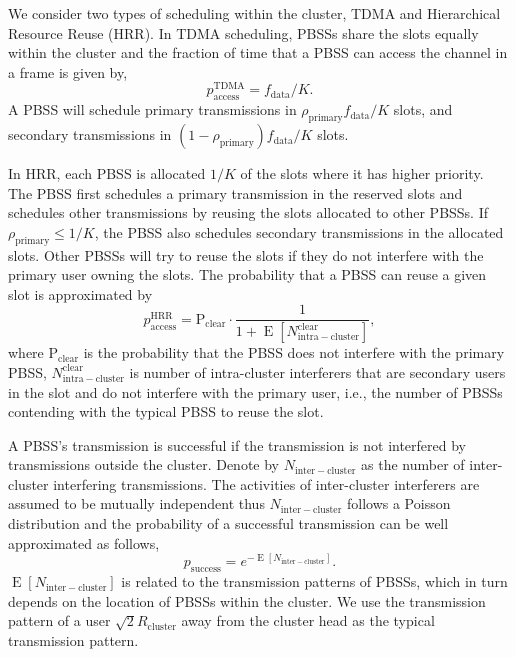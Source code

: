 \documentclass[10pt, conference, letterpaper]{IEEEtran}
\DeclareMathOperator*{\E}{\mathrm{E}}
\begin{document}
We consider two types of scheduling within the cluster, TDMA and Hierarchical Resource Reuse (HRR). In TDMA scheduling, PBSSs share the slots equally within the cluster and the fraction of time that a PBSS can access the channel in a frame is given by, 
\begin{equation*}
p_{\mathrm{access}}^{\mathrm{TDMA}} = f_{\mathrm{data}}/K.
\end{equation*}
A PBSS will schedule primary transmissions in $\rho_{\mathrm{primary}}f_{\mathrm{data}}/K$ slots, and secondary transmissions in $(1-\rho_{\mathrm{primary}})f_{\mathrm{data}}/K$ slots. 

In HRR, each PBSS is allocated $1/K$ of the slots where it has higher priority. 
The PBSS first schedules a primary transmission in the reserved slots and schedules other transmissions by reusing the slots allocated to other PBSSs. 
If $\rho_{\mathrm{primary}}\leq 1/K$, the PBSS also schedules secondary transmissions in the allocated slots. 
Other PBSSs will try to reuse the slots if they do not interfere with the primary user owning the slots.
The probability that a PBSS can reuse a given slot is approximated by
\begin{equation*}
p_{\mathrm{access}}^{\mathrm{HRR}}=\mathrm{P}_{\mathrm{clear}}\cdot \frac{1}{1+\E[N_{\mathrm{intra-cluster}}^{\mathrm{clear}}]},
\end{equation*}
where $\mathrm{P}_{\mathrm{clear}}$ is the probability that the PBSS does not interfere with the primary PBSS, 
$N_{\mathrm{intra-cluster}}^{\mathrm{clear}}$ is number of intra-cluster interferers that are secondary users in the slot and do not interfere with the primary user, i.e., the number of PBSSs contending with the typical PBSS to reuse the slot.


A PBSS's transmission is successful if the transmission is not interfered by transmissions outside the cluster. 
Denote by $N_{\mathrm{inter-cluster}}$ as the number of inter-cluster interfering transmissions. 
The activities of inter-cluster interferers are assumed to be mutually independent thus $N_{\mathrm{inter-cluster}}$ follows a Poisson distribution and the probability of a successful transmission can be well approximated as follows, 
\begin{equation*}
p_{\mathrm{success}} = e^{-\E[N_{\mathrm{inter-cluster}}]}.
\end{equation*} 
$\E[N_{\mathrm{inter-cluster}}]$ is related to the transmission patterns of PBSSs, which in turn depends on the location of PBSSs within the cluster. 
We use the transmission pattern of a user $\sqrt{2}R_{\mathrm{cluster}}$ away from the cluster head as the typical transmission pattern.
\end{document}
